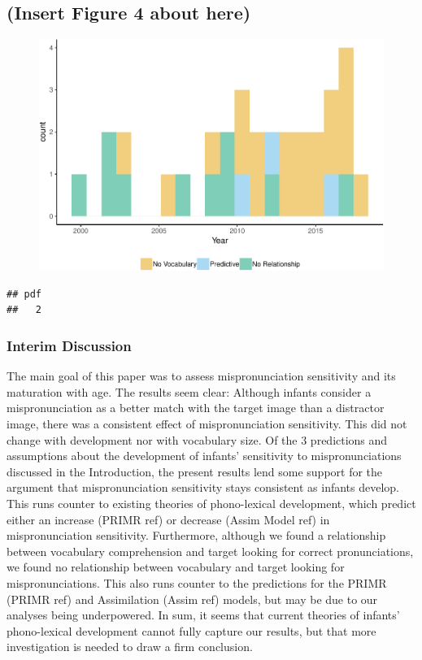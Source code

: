 \documentclass[man]{apa6}
\theoremstyle{definition}
\theoremstyle{definition}
\theoremstyle{definition}
\theoremstyle{remark}
\begin{document}
\subsection{(Insert Figure 4 about
here)}\label{insert-figure-4-about-here}

\begin{figure}
\centering
\includegraphics{Paper_Analyses_files/figure-latex/Vocab_describe1-1.pdf}
\caption{}
\end{figure}

\begin{verbatim}
## pdf 
##   2
\end{verbatim}

\subsubsection{Interim Discussion}\label{interim-discussion}

The main goal of this paper was to assess mispronunciation sensitivity
and its maturation with age. The results seem clear: Although infants
consider a mispronunciation as a better match with the target image than
a distractor image, there was a consistent effect of mispronunciation
sensitivity. This did not change with development nor with vocabulary
size. Of the 3 predictions and assumptions about the development of
infants' sensitivity to mispronunciations discussed in the Introduction,
the present results lend some support for the argument that
mispronunciation sensitivity stays consistent as infants develop. This
runs counter to existing theories of phono-lexical development, which
predict either an increase (PRIMR ref) or decrease (Assim Model ref) in
mispronunciation sensitivity. Furthermore, although we found a
relationship between vocabulary comprehension and target looking for
correct pronunciations, we found no relationship between vocabulary and
target looking for mispronunciations. This also runs counter to the
predictions for the PRIMR (PRIMR ref) and Assimilation (Assim ref)
models, but may be due to our analyses being underpowered. In sum, it
seems that current theories of infants' phono-lexical development cannot
fully capture our results, but that more investigation is needed to draw
a firm conclusion.
\end{document}
